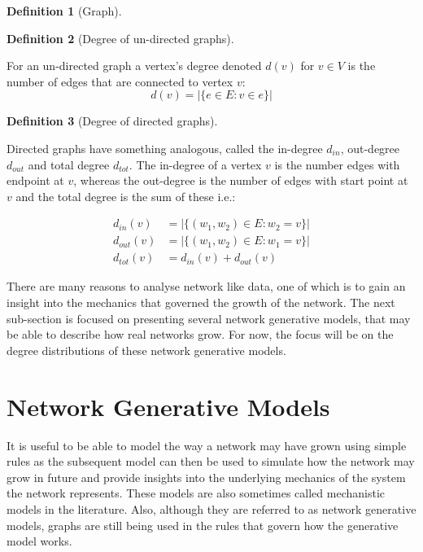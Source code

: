 \documentclass[
  10pt,
  a4paper,
]{scrreprt}
\theoremstyle{plain}
\theoremstyle{plain}
\theoremstyle{definition}
\newtheorem{definition}{Definition}[section]
\theoremstyle{plain}
\theoremstyle{remark}
\begin{document}
{\begin{definition}[Graph]
\end{definition}

\begin{definition}[Degree of un-directed
graphs]\protect\hypertarget{def-deg}{}\label{def-deg}

For an un-directed graph a vertex's degree denoted \(d(v)\) for
\(v\in V\) is the number of edges that are connected to vertex \(v\): \[
d(v) = |\{e\in E : v \in e\}|
\]

\end{definition}

\begin{definition}[Degree of directed
graphs]\protect\hypertarget{def-dirdeg}{}\label{def-dirdeg}

Directed graphs have something analogous, called the in-degree
\(d_{in}\), out-degree \(d_{out}\) and total degree \(d_{tot}\). The
in-degree of a vertex \(v\) is the number edges with endpoint at \(v\),
whereas the out-degree is the number of edges with start point at \(v\)
and the total degree is the sum of these i.e.:

\begin{align*}
d_{in}(v)&= |\{(w_1,w_2)\in E: w_2=v \}|\\
d_{out}(v) &= |\{(w_1,w_2)\in E: w_1=v \}|\\
d_{tot}(v) &= d_{in}(v) + d_{out}(v)
\end{align*}

\end{definition}

There are many reasons to analyse network like data, one of which is to
gain an insight into the mechanics that governed the growth of the
network. The next sub-section is focused on presenting several network
generative models, that may be able to describe how real networks grow.
For now, the focus will be on the degree distributions of these network
generative models.

\hypertarget{sec-gen}{%
\section{Network Generative Models}\label{sec-gen}}

It is useful to be able to model the way a network may have grown using
simple rules as the subsequent model can then be used to simulate how
the network may grow in future and provide insights into the underlying
mechanics of the system the network represents. These models are also
sometimes called mechanistic models in the literature. Also, although
they are referred to as network generative models, graphs are still
being used in the rules that govern how the generative model works.

}
\end{document}
